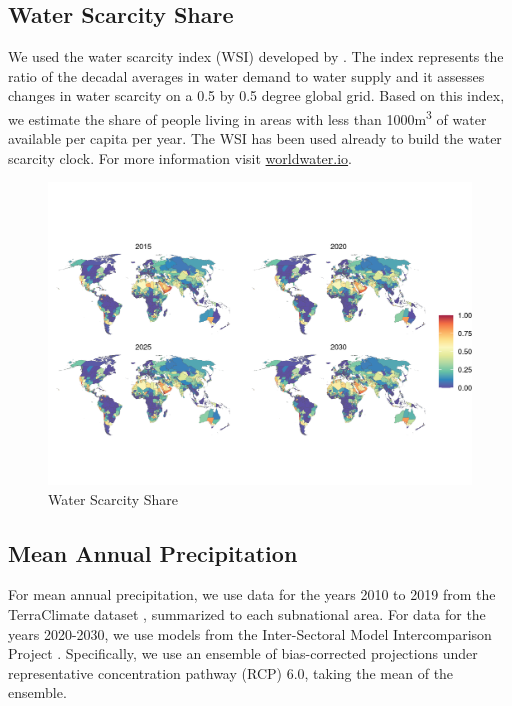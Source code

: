 \documentclass{article}
\begin{document}
\subsection{Water Scarcity Share}
We used the water scarcity index (WSI) developed by \citep{greve2018global}. The index represents the ratio of the decadal averages in water demand to water supply and it assesses changes in water scarcity on a 0.5 by 0.5 degree global grid.  Based on this index, we estimate the share of people living in areas with less than 1000m\textsuperscript{3} of water available per capita per year. The WSI has been used already to build the water scarcity clock. For more information visit \href{https://worldwater.io/}{worldwater.io}.

\begin{figure}[H]
  \centering
  \includegraphics[width=\linewidth]{img/covars/ws_share.png}
  \caption{Water Scarcity Share}
\end{figure}


\subsection{Mean Annual Precipitation}
For mean annual precipitation, we use data for the years 2010 to 2019 from the TerraClimate dataset \citep{abatzoglou2018terraclimate}, summarized to each subnational area.  For data for the years 2020-2030, we use models from the Inter-Sectoral Model Intercomparison Project \citep{warszawski2014inter}.  Specifically, we use an ensemble of bias-corrected projections under representative concentration pathway (RCP) 6.0, taking the mean of the ensemble.
\end{document}
